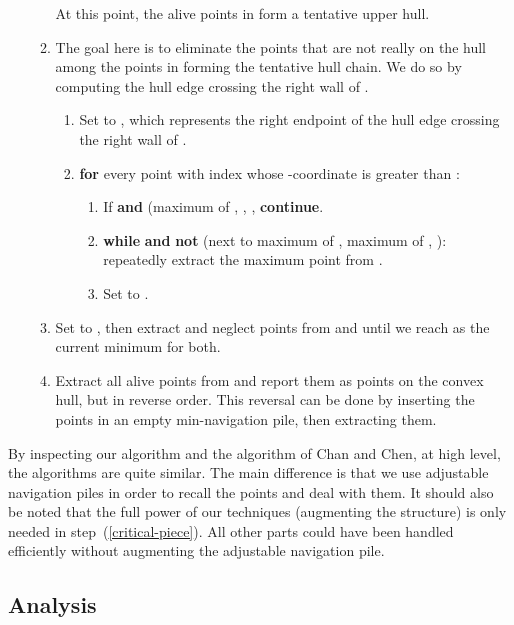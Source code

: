 \documentclass[final,onetabnum,onefignum,onethmnum]{siamltex}
\newcommand{\MinOne}{\mbox{}}
\newcommand{\MinTwo}{\mbox{}}
\newcommand{\MaxPile}{\mbox{}}
\begin{document}
\begin{enumerate}
\begin{enumerate}
At this point, the alive points in \MaxPile{} form a tentative upper hull.  

\item The goal here is to eliminate the points that are not really on the hull
among the points in \MaxPile{} forming the tentative hull chain. We do so by 
computing the hull edge crossing the right wall of .

\begin{enumerate}
\item Set  to , which represents the right endpoint of the hull edge crossing the right wall of .
\item \textbf{for} every point with index  whose -coordinate is
  greater than :

\begin{enumerate}
\item If  \textbf{and} (maximum of \MaxPile{}, , , \textbf{continue}.
\item \textbf{while}  \textbf{and} \textbf{not} (next to maximum of \MaxPile{},  maximum of \MaxPile{},
):\\ \hspace*{1.25em}
repeatedly extract the maximum point from \MaxPile{}.\item Set  to .
\end{enumerate}
\end{enumerate}

\item \label{spec} Set  to , then extract and
  neglect points from \MinOne{} and \MinTwo{} until we reach  as
  the current minimum for both.
\item  Extract all alive points from \MaxPile{} and report them as points on the convex hull, but in reverse order. This reversal can be done by inserting the points in an empty min-navigation pile, then extracting them.
\end{enumerate}
\end{enumerate}

By inspecting our algorithm and the algorithm of Chan and Chen, at
high level, the algorithms are quite similar. The main
difference is that we use adjustable navigation piles in order to
recall the points and deal with them. It should also be noted that
the full power of our techniques (augmenting the structure) is only needed 
in step~(\ref{critical-piece}). All other parts could have been handled efficiently without
augmenting the adjustable navigation pile.

\subsection{Analysis}
\end{document}
